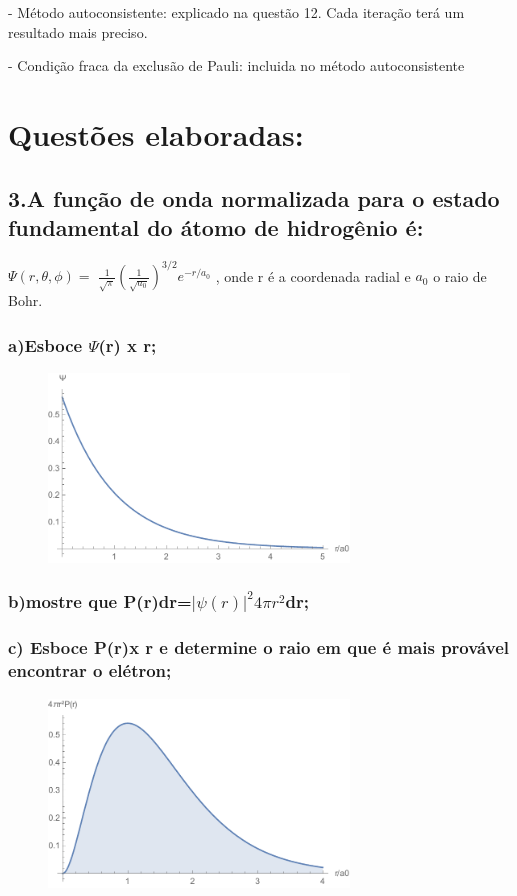 \documentclass{article}
\begin{document}
- Método autoconsistente: explicado na questão 12. Cada iteração terá um resultado mais preciso.

- Condição fraca da exclusão de Pauli: incluida no método autoconsistente

\section{Questões elaboradas:}

\subsection{3.A função de onda normalizada para o estado fundamental do átomo de hidrogênio é:
}
$\Psi(r,\theta,\phi) =$
$\frac{1}{\sqrt{\pi}}\left( \frac{1}{\sqrt{a_0}}\right)^{3/2}e^{-r/a_0}$
, onde r é a coordenada radial e $a_0$ o raio de Bohr.

\subsubsection{a)Esboce $\Psi$(r) x r;}

\begin{figure}[H]
\centering
\includegraphics[width = 8cm]{itema.pdf}
\end{figure}

\subsubsection{b)mostre que P(r)dr=$|\psi(r)|^2 4 \pi r^2$dr; }
\subsubsection{c) Esboce P(r)x r e determine o raio em que é mais provável encontrar o elétron; }
\begin{figure}[H]
\centering
\includegraphics[width = 8cm]{item3c.pdf}
\end{figure}
\end{document}
